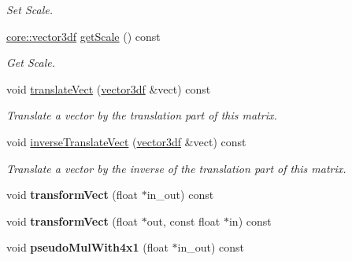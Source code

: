 \begin{DoxyCompactItemize}
\begin{DoxyCompactList}\small\item\em Set Scale. \end{DoxyCompactList}\item 
\hyperlink{namespaceirr_1_1core_a06f169d08b5c429f5575acb7edbad811}{core\+::vector3df} \hyperlink{classirr_1_1core_1_1matrix4x3_a63e1552db1e60237827f5334ac6699b7}{get\+Scale} () const 
\begin{DoxyCompactList}\small\item\em Get Scale. \end{DoxyCompactList}\item 
void \hyperlink{classirr_1_1core_1_1matrix4x3_a8d0149aed94699d0b2d074a1a301fa31}{translate\+Vect} (\hyperlink{namespaceirr_1_1core_a06f169d08b5c429f5575acb7edbad811}{vector3df} \&vect) const \hypertarget{classirr_1_1core_1_1matrix4x3_a8d0149aed94699d0b2d074a1a301fa31}{}\label{classirr_1_1core_1_1matrix4x3_a8d0149aed94699d0b2d074a1a301fa31}

\begin{DoxyCompactList}\small\item\em Translate a vector by the translation part of this matrix. \end{DoxyCompactList}\item 
void \hyperlink{classirr_1_1core_1_1matrix4x3_a512f3d3e7b6be4e5183085e46b86e45c}{inverse\+Translate\+Vect} (\hyperlink{namespaceirr_1_1core_a06f169d08b5c429f5575acb7edbad811}{vector3df} \&vect) const \hypertarget{classirr_1_1core_1_1matrix4x3_a512f3d3e7b6be4e5183085e46b86e45c}{}\label{classirr_1_1core_1_1matrix4x3_a512f3d3e7b6be4e5183085e46b86e45c}

\begin{DoxyCompactList}\small\item\em Translate a vector by the inverse of the translation part of this matrix. \end{DoxyCompactList}\item 
void {\bfseries transform\+Vect} (float $\ast$in\+\_\+out) const \hypertarget{classirr_1_1core_1_1matrix4x3_a965719803197a818a73a3cac465865fe}{}\label{classirr_1_1core_1_1matrix4x3_a965719803197a818a73a3cac465865fe}

\item 
void {\bfseries transform\+Vect} (float $\ast$out, const float $\ast$in) const \hypertarget{classirr_1_1core_1_1matrix4x3_a2f2ff5f975bd5d6e33dbf47fed7d3d5d}{}\label{classirr_1_1core_1_1matrix4x3_a2f2ff5f975bd5d6e33dbf47fed7d3d5d}

\item 
void {\bfseries pseudo\+Mul\+With4x1} (float $\ast$in\+\_\+out) const \hypertarget{classirr_1_1core_1_1matrix4x3_ad865bc374df007cb04b9b962a2a6e50c}{}\label{classirr_1_1core_1_1matrix4x3_ad865bc374df007cb04b9b962a2a6e50c}


\end{DoxyCompactItemize}
